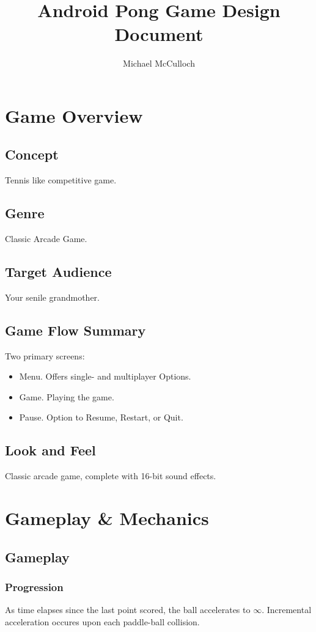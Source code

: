 \documentclass[12pt, letterpaper]{article}
\title{Android Pong Game Design Document}
\author{Michael McCulloch}
\begin{document}
\maketitle
\pagebreak
\tableofcontents
\pagebreak
\section{Game Overview}
    \subsection{Concept}
    Tennis like competitive game.
    \subsection{Genre}
    Classic Arcade Game.
    \subsection{Target Audience}
    Your senile grandmother.
    \subsection{Game Flow Summary}
    Two primary screens: 
    \begin{itemize}
        \item Menu. Offers single- and multiplayer Options.
        \item Game. Playing the game.
        \item Pause. Option to Resume, Restart, or Quit.
    \end{itemize}
    \subsection{Look and Feel}
    Classic arcade game, complete with 16-bit sound effects.
\section{Gameplay \& Mechanics}
    \subsection{Gameplay}
        \subsubsection{Progression}
        As time elapses since the last point scored, the ball accelerates to $\infty$. Incremental acceleration occures upon each paddle-ball collision.
\end{document}

